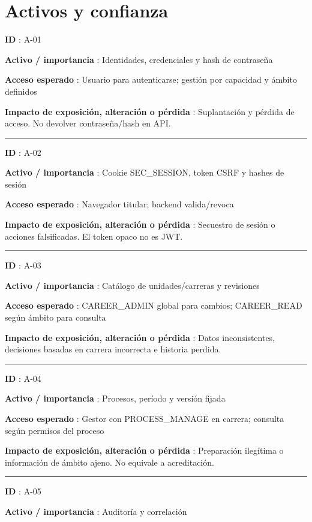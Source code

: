 \documentclass[12pt,a4paper]{report}
\begin{document}
\section{Activos y
confianza}\label{AA4-semana-4-anexo0-activos-y-confianza}

\textbf{ID }: A-01

\textbf{Activo / importancia }: Identidades, credenciales y hash de
contraseña

\textbf{Acceso esperado }: Usuario para autenticarse; gestión por
capacidad y ámbito definidos

\textbf{Impacto de exposición, alteración o pérdida }: Suplantación y
pérdida de acceso. No devolver contraseña/hash en API.

\medskip\hrule\medskip

\textbf{ID }: A-02

\textbf{Activo / importancia }: Cookie SEC\_SESSION, token CSRF y hashes
de sesión

\textbf{Acceso esperado }: Navegador titular; backend valida/revoca

\textbf{Impacto de exposición, alteración o pérdida }: Secuestro de
sesión o acciones falsificadas. El token opaco no es JWT.

\medskip\hrule\medskip

\textbf{ID }: A-03

\textbf{Activo / importancia }: Catálogo de unidades/carreras y
revisiones

\textbf{Acceso esperado }: CAREER\_ADMIN global para cambios;
CAREER\_READ según ámbito para consulta

\textbf{Impacto de exposición, alteración o pérdida }: Datos
inconsistentes, decisiones basadas en carrera incorrecta e historia
perdida.

\medskip\hrule\medskip

\textbf{ID }: A-04

\textbf{Activo / importancia }: Procesos, período y versión fijada

\textbf{Acceso esperado }: Gestor con PROCESS\_MANAGE en carrera;
consulta según permisos del proceso

\textbf{Impacto de exposición, alteración o pérdida }: Preparación
ilegítima o información de ámbito ajeno. No equivale a acreditación.

\medskip\hrule\medskip

\textbf{ID }: A-05

\textbf{Activo / importancia }: Auditoría y correlación
\end{document}
